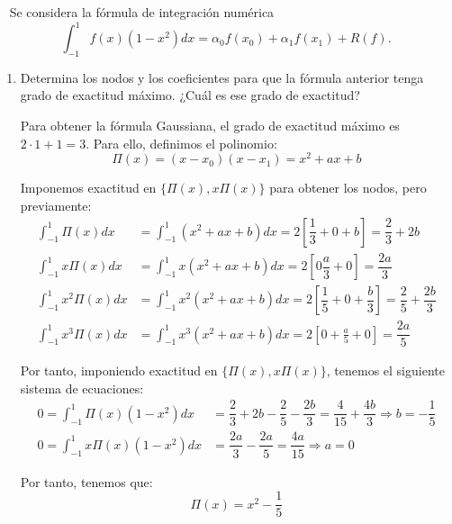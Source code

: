 \begin{ejercicio}[DGIIM 2023/24]~\label{ej:2.3.8}
    Se considera la fórmula de integración numérica
    \begin{equation*}
        \int_{-1}^{1} f(x)(1 - x^2)dx = \alpha_0 f(x_0) + \alpha_1 f(x_1) + R(f).
    \end{equation*}
    \begin{enumerate}
        \item Determina los nodos y los coeficientes para que la fórmula anterior tenga grado de exactitud máximo. ¿Cuál es ese grado de exactitud?
        
        Para obtener la fórmula Gaussiana, el grado de exactitud máximo es $2\cdot 1 + 1 = 3$. Para ello, definimos el polinomio:
        \begin{equation*}
            \Pi(x) = (x - x_0)(x - x_1) = x^2 + ax + b
        \end{equation*}

        Imponemos exactitud en $\{\Pi(x), x\Pi(x)\}$ para obtener los nodos, pero previamente:
        \begin{align*}
            \int_{-1}^{1} \Pi(x)dx &= \int_{-1}^{1} (x^2 + ax + b)dx = 2\left[\dfrac{1}{3} + 0 + b\right] = \dfrac{2}{3} + 2b\\
            \int_{-1}^{1} x\Pi(x)dx &= \int_{-1}^{1} x(x^2 + ax + b)dx = 2\left[0 \dfrac{a}{3} + 0\right] = \dfrac{2a}{3}\\
            \int_{-1}^{1} x^2\Pi(x)dx &= \int_{-1}^{1} x^2(x^2 + ax + b)dx = 2\left[\dfrac{1}{5} + 0 + \dfrac{b}{3}\right] = \dfrac{2}{5} + \dfrac{2b}{3}\\
            \int_{-1}^{1} x^3\Pi(x)dx &= \int_{-1}^{1} x^3(x^2 + ax + b)dx = 2\left[0 + \frac{a}{5} + 0\right] = \dfrac{2a}{5}
        \end{align*}

        Por tanto, imponiendo exactitud en $\{\Pi(x), x\Pi(x)\}$, tenemos el siguiente sistema de ecuaciones:
        \begin{align*}
            0 = \int_{-1}^{1} \Pi(x)(1 - x^2)dx &= \dfrac{2}{3} + 2b - \dfrac{2}{5} - \dfrac{2b}{3} = \dfrac{4}{15} + \dfrac{4b}{3} \Longrightarrow
            b = -\dfrac{1}{5}\\
            0 = \int_{-1}^{1} x\Pi(x)(1 - x^2)dx &= \dfrac{2a}{3} - \dfrac{2a}{5}
            = \dfrac{4a}{15}
            \Longrightarrow a = 0
        \end{align*}

        Por tanto, tenemos que:
        \begin{equation*}
            \Pi(x) = x^2 - \frac{1}{5}
        \end{equation*}


\end{enumerate}
\end{ejercicio}
